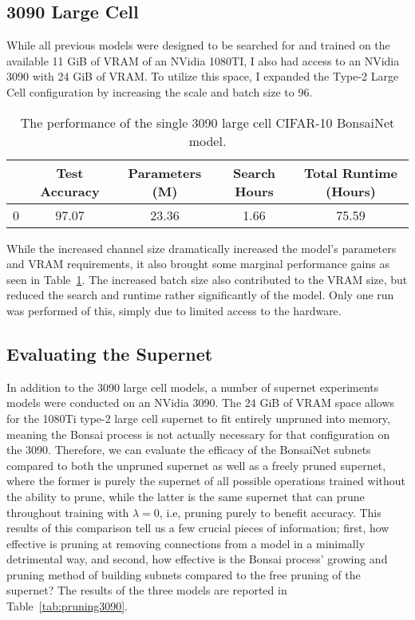 \subsection{3090 Large Cell}
While all previous models were designed to be searched for and trained on the available 11 GiB of VRAM of an NVidia 1080TI,
I also had access to an NVidia 3090 with 24 GiB of VRAM. To utilize this space, I expanded the Type-2 Large Cell
configuration by increasing the scale and batch size to 96.

\begin{table}[h]
\begin{center}
	\begin{tabular}{r|c|c|c|c}
	 & Test Accuracy & Parameters (M) & Search Hours & Total Runtime (Hours) \\
	\hline
	0 	 & 97.07 & 23.36 & 1.66 & 75.59\\
	\end{tabular}
\end{center}
\caption{The performance of the single 3090 large cell CIFAR-10 BonsaiNet model.}
\label{tab:large_cell_metricsv2}
\end{table}

While the increased channel size dramatically increased the model's parameters and VRAM requirements, it also brought
some marginal performance gains as seen in Table~\ref{tab:large_cell_metricsv2}.
The increased batch size also contributed to the VRAM size, but reduced the search and runtime
rather significantly of the model.  Only one run was performed of this, simply due to limited access to the hardware.

\subsection{Evaluating the Supernet} \label{sect:supernetevaluation}
In addition to the 3090 large cell models, a number of supernet experiments models were conducted on an NVidia 3090.
The 24 GiB of VRAM space allows
for the 1080Ti type-2 large cell supernet to fit entirely unpruned into memory, meaning the Bonsai process is not actually
necessary for that configuration on the 3090. Therefore, we can evaluate the efficacy of the BonsaiNet subnets compared
to both the unpruned supernet as well as a freely pruned supernet, where the former is purely the supernet of all possible
operations trained without the ability to prune, while the latter is the same supernet that can prune throughout training with
$\lambda=0$, i.e, pruning purely to benefit accuracy. This results of this comparison tell us a few crucial pieces of information; first,
how effective is pruning at removing connections from a model in a minimally detrimental way, and second, how effective
is the Bonsai process' growing and pruning method of building subnets compared to the free pruning of the supernet?
The results of the three models are reported in Table~\ref{tab:pruning3090}.


